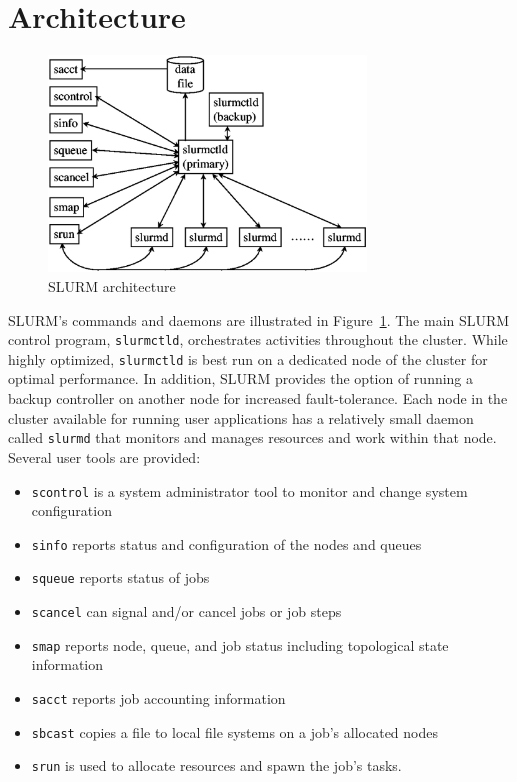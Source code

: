 \documentclass{../common/acm}
\begin{document}
\section{Architecture}

\begin{figure}[tb]
\centerline{\includegraphics[width=3.32in]{../figures/arch2.eps}}
\caption{\small SLURM architecture}
\label{arch}
\end{figure}

SLURM's commands and daemons are illustrated in Figure~\ref{arch}.
The main SLURM control program, {\tt slurmctld}, orchestrates
activities throughout the cluster. While highly optimized,
{\tt slurmctld} is best run on a dedicated node of the cluster for optimal performance.
In addition, SLURM provides the option of running  a backup controller
on another node for increased fault-tolerance.
Each node in the cluster available for running user applications
has a relatively small daemon called {\tt slurmd} that monitors
and manages resources and work within that node.
Several user tools are provided:

\begin{itemize}
\item {\tt scontrol} is a system administrator tool to monitor and change
system configuration

\item {\tt sinfo} reports status and configuration of the nodes and queues

\item {\tt squeue} reports status of jobs

\item {\tt scancel} can signal and/or cancel jobs or job steps

\item {\tt smap} reports node, queue, and job status including
topological state information

\item {\tt sacct} reports job accounting information

\item {\tt sbcast} copies a file to local file systems on a job's allocated nodes

\item {\tt srun} is used to allocate resources and spawn the job's tasks.
\end{itemize}
\end{document}
